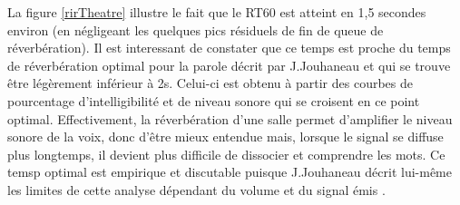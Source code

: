 La figure \ref{rirTheatre} illustre le fait que le \gls{RT60} est atteint en 1,5 secondes environ (en négligeant les quelques pics résiduels de fin de queue de réverbération). Il est interessant de constater que ce temps est proche du temps de réverbération optimal pour la parole décrit par J.Jouhaneau \cite[p.209]{jouhaneau} et qui se trouve être légèrement inférieur à 2s. Celui-ci est obtenu à partir des courbes de pourcentage d'intelligibilité et de niveau sonore qui se croisent en ce point optimal. Effectivement, la réverbération d'une salle permet d'amplifier le niveau sonore de la voix, donc d'être mieux entendue mais, lorsque le signal se diffuse plus longtemps, il devient plus difficile de dissocier et comprendre les mots. Ce temsp optimal est empirique et discutable puisque J.Jouhaneau décrit lui-même les limites de cette analyse dépendant du volume et du signal émis \cite[p.218]{jouhaneau}. 

